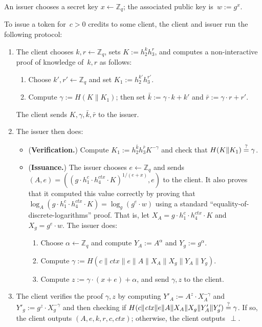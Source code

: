 \documentclass[11pt]{article}
\def\Z{{\mathbb Z}}
\def\Z{{\mathbb Z}}
\def\isequal{\stackrel{\rm ?}{=}}
\begin{document}
\medskip{}
An issuer chooses a secret key $x \leftarrow \Z_q$; the associated public key is~$w:=g^x$. 

\medskip{} 
To issue a token for~$c>0$ credits to some client, the client and issuer run the following protocol:
\begin{enumerate}
    \item The client chooses $k, r \leftarrow \Z_q$,  sets $K:=h_2^k h_3^r$, and computes a non-interactive proof of knowledge of~$k, r$ as follows: 
    \begin{enumerate}
        \item Choose $k', r' \leftarrow \Z_q$ and set $K_1:=h_2^{k'} h_3^{r'}$.
        \item Compute $\gamma:=H(K \| K_1)$; then set $\bar k:=\gamma \cdot k + k'$ and $\bar r := \gamma \cdot r + r'$. 
    \end{enumerate}
    The client sends $K, \gamma, \bar k, \bar r$ to the issuer.
    
    \item The issuer then does:
    \begin{itemize} 
    \item ({\bf Verification.}) Compute $K_1:= h_2^{\bar k} h_3^{\bar r} K^{-\gamma}$ and check that $H(K\|K_1) \isequal \gamma$.

\item ({\bf Issuance.}) The issuer chooses
$e \leftarrow \Z_q$ and sends
$(A, e) = \left(\left(g \cdot h_1^c \cdot h_4^{\mathit{ctx}} \cdot K\right)^{1/(e+x)}, e\right)$
to the client.
It also proves that it computed this value correctly by proving that $\log_A \left(g \cdot h_1^c \cdot h_4^{\mathit{ctx}} \cdot K\right) = \log_g \left(g^e \cdot w\right)$ using a standard ``equality-of-discrete-logarithms'' proof.
That is, let $X_A = g \cdot h_1^c \cdot h_4^{\mathit{ctx}} \cdot K$ and $X_g = g^e \cdot w$. The issuer does:
\begin{enumerate}
    \item Choose $\alpha \leftarrow \Z_q$ and compute $Y_A:= A^{\alpha}$ and $Y_g:=g^\alpha$.
    \item Compute $\gamma:=H(c\|\mathit{ctx}\|e\|A\|X_A\|X_g\|Y_A\|Y_g)$.
    \item Compute $z:=\gamma\cdot (x+e)+\alpha$, and send $\gamma, z$ to the client.
\end{enumerate}
\end{itemize}
\item The client verifies the proof $\gamma, z$ by computing $Y'_A:= A^z \cdot X_A^{-\gamma}$ and $Y'_g:=g^z \cdot X_g^{-\gamma}$ and then
checking if
$H( c\|\mathit{ctx}\|e\|A\|X_A\|X_g\|Y'_A \| Y'_g ) \isequal \gamma$. If so, the client outputs $(A, e, k, r, c, \mathit{ctx})$; otherwise, the client outputs~$\perp$.
\end{enumerate}
\end{document}
